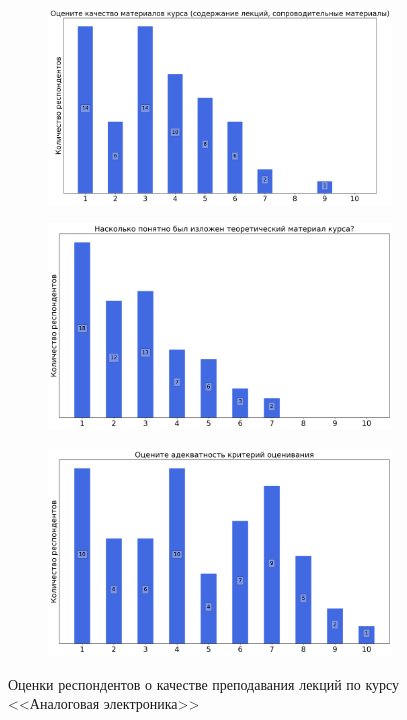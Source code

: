 \begin{figure}[H]
\begin{subfigure}[b]{0.45\textwidth}
				\includegraphics[width=\textwidth]{images/3 course/Аналоговая электроника/lecturer-marks-Дунаева М.А.-1.png}
			\end{subfigure}
			\begin{subfigure}[b]{0.45\textwidth}
				\centering
				\includegraphics[width=\textwidth]{images/3 course/Аналоговая электроника/lecturer-marks-Дунаева М.А.-2.png}
			\end{subfigure}	
			\begin{subfigure}[b]{0.45\textwidth}
				\centering
				\includegraphics[width=\textwidth]{images/3 course/Аналоговая электроника/lecturer-marks-Дунаева М.А.-3.png}
			\end{subfigure}
			\caption{Оценки респондентов о качестве преподавания лекций по курсу <<Аналоговая электроника>>}
		\end{figure}

